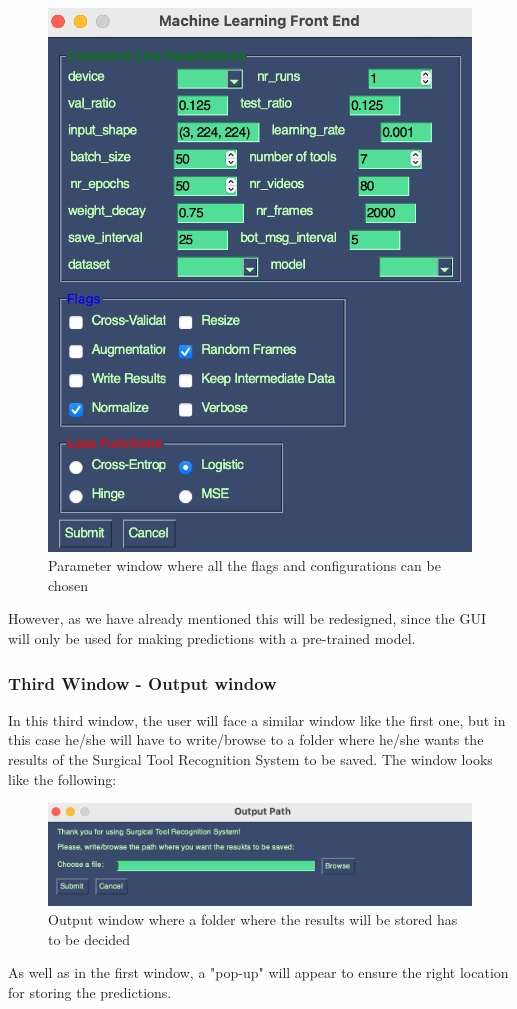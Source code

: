 \documentclass{article}
\begin{document}
\begin{figure}[H]
    \centering
    \includegraphics[width = 0.5\linewidth]{Parameter_window.png}
    \caption{Parameter window where all the flags and configurations can be chosen}
    \label{fig:parameter}
\end{figure}
\noindent
However, as we have already mentioned this will be redesigned, since the GUI will only be used for making predictions with a pre-trained model.

\subsubsection{Third Window - Output window}
In this third window, the user will face a similar window like the first one, but in this case he/she will have to write/browse to a folder where he/she wants the results of the Surgical Tool Recognition System to be saved. The window looks like the following:

\begin{figure}[H]
    \centering
    \includegraphics[width = \linewidth]{Output_window.png}
    \caption{Output window where a folder where the results will be stored has to be decided}
    \label{fig:output}
\end{figure}
\noindent
As well as in the first window, a "pop-up" will appear to ensure the right location for storing the predictions.
\end{document}
